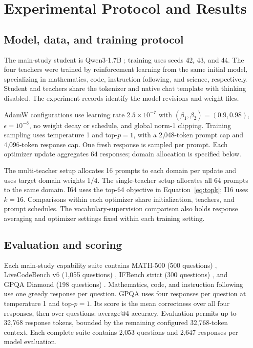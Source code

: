 \section{Experimental Protocol and Results}
\label{app:setup}

\subsection{Model, data, and training protocol}

The main-study student is Qwen3-1.7B \citep{qwen2025qwen3}; training uses seeds 42, 43, and 44. The four teachers were trained by reinforcement learning from the same initial model, specializing in mathematics, code, instruction following, and science, respectively. Student and teachers share the tokenizer and native chat template with thinking disabled. The experiment records identify the model revisions and weight files.

AdamW configurations use learning rate $2.5\times10^{-7}$ with $(\beta_1,\beta_2)=(0.9,0.98)$, $\epsilon=10^{-8}$, no weight decay or schedule, and global norm-1 clipping. Training sampling uses temperature 1 and top-$p=1$, with a 2,048-token prompt cap and 4,096-token response cap. One fresh response is sampled per prompt. Each optimizer update aggregates 64 responses; domain allocation is specified below.

The multi-teacher setup allocates 16 prompts to each domain per update and uses target domain weights $1/4$. The single-teacher setup allocates all 64 prompts to the same domain. I64 uses the top-$64$ objective in Equation~\ref{eq:topk}; I16 uses $k=16$. Comparisons within each optimizer share initialization, teachers, and prompt schedules. The vocabulary-supervision comparison also holds response averaging and optimizer settings fixed within each training setting.


\subsection{Evaluation and scoring}

Each main-study capability suite contains MATH-500 (500 questions) \citep{hendrycks2021math}, LiveCodeBench v6 (1,055 questions) \citep{jain2024livecodebench}, IFBench strict (300 questions) \citep{pyatkin2025ifbench}, and GPQA Diamond (198 questions) \citep{rein2023gpqa}. Mathematics, code, and instruction following use one greedy response per question. GPQA uses four responses per question at temperature 1 and top-$p=1$. Its score is the mean correctness over all four responses, then over questions: average@4 accuracy. Evaluation permits up to 32,768 response tokens, bounded by the remaining configured 32,768-token context. Each complete suite contains 2,053 questions and 2,647 responses per model evaluation.

